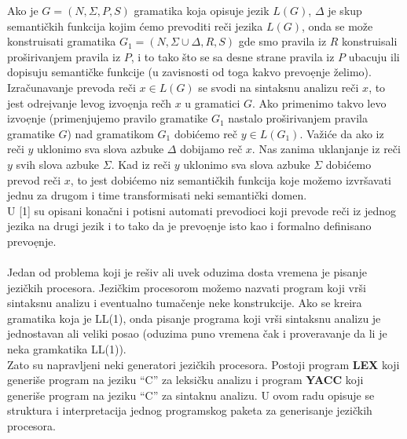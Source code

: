       Ako je $G=(N,\Sigma,P,S)$ gramatika koja opisuje jezik $L(G)$,
      $\Delta$ je skup semanti\v ckih funkcija kojim \'cemo prevoditi
      re\v ci jezika $L(G)$, onda se mo\v ze konstruisati gramatika
      $G_{1}=(N,\Sigma\cup\Delta,R,S)$ gde smo pravila iz $R$ konstruisali
      pro\v sirivanjem pravila iz $P$, i to tako \v sto se sa desne
      strane pravila iz $P$ ubacuju ili dopisuju semanti\v cke funkcije
      (u zavisnosti od toga kakvo prevo\d enje \v zelimo).\\
      Izra\v cunavanje prevoda re\v ci $x\in L(G)$ se svodi na sintaksnu
      analizu re\v ci $x$, to jest odre\d ivanje levog izvo\d enja
      re\v ch $x$ u gramatici $G$.
      Ako primenimo takvo levo izvo\d enje (primenjujemo pravilo gramatike
      $G_{1}$ nastalo pro\v sirivanjem pravila gramatike $G$) nad
      gramatikom $G_{1}$ dobi\'cemo re\v c $y\in L(G_{1})$.
      Va\v zi\'ce da ako iz re\v ci $y$ uklonimo sva slova azbuke $\Delta$
      dobijamo re\v c $x$.
      Nas zanima uklanjanje iz re\v ci $y$ svih slova azbuke $\Sigma$.
      Kad iz re\v ci $y$ uklonimo sva slova azbuke $\Sigma$ dobi\'cemo
      prevod re\v ci $x$, to jest dobi\'cemo niz semanti\v ckih funkcija
      koje mo\v zemo izvr\v savati jednu za drugom i time
      transformisati neki semanti\v cki domen.\\
      U [1] su opisani kona\v cni i potisni automati prevodioci koji
      prevode re\v ci iz jednog jezika na drugi jezik i to tako da je
      prevo\d enje isto kao i formalno definisano prevo\d enje.\\
      \\
      Jedan od problema koji je re\v siv ali uvek oduzima dosta vremena
      je pisanje jezi\v ckih procesora.
      Jezi\v ckim procesorom mo\v zemo nazvati program koji vr\v si
      sintaksnu analizu i eventualno tuma\v cenje neke konstrukcije.
      Ako se kreira gramatika koja je LL(1), onda pisanje programa koji
      vr\v si sintaksnu analizu je jednostavan ali veliki posao (oduzima
      puno vremena \v cak i proveravanje  da li je neka gramkatika LL(1)).\\
      Zato su napravljeni neki generatori jezi\v ckih procesora.
      Postoji program {\bf LEX} koji generi\v se program na jeziku ``C'' za
      leksi\v cku analizu i program {\bf YACC} koji generi\v se program
      na jeziku ``C'' za sintaknu analizu.
      U ovom radu opisuje se struktura i interpretacija jednog programskog
      paketa za generisanje jezi\v ckih procesora.\\
      \\
